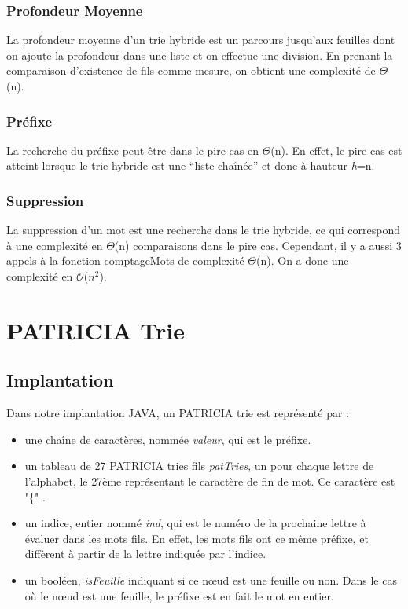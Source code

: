 \documentclass[a4paper,12pt]{report}
\begin{document}
\subsection{Profondeur Moyenne}
La profondeur moyenne d'un trie hybride est un parcours jusqu'aux feuilles dont on ajoute la profondeur dans une liste et on effectue
une division. En prenant la comparaison d'existence de fils comme mesure, on obtient une complexité de $\Theta$(n).

\subsection{Préfixe}
La recherche du préfixe peut être dans le pire cas en $\Theta$(n). En effet, le pire cas est atteint lorsque le trie hybride
est une ``liste chaînée'' et donc à hauteur \textit{h}=n.

\subsection{Suppression}
La suppression d'un mot est une recherche dans le trie hybride, ce qui correspond à une complexité en $\Theta$(n) comparaisons
dans le pire cas. Cependant, il y a aussi 3 appels à la fonction comptageMots de complexité $\Theta$(n).
On a donc une complexité en $\mathcal{O}$($n^2$).

\chapter{PATRICIA Trie}
\section{Implantation}
Dans notre implantation JAVA, un PATRICIA trie est représenté par :
\begin{itemize}
\item une chaîne de caractères, nommée {\itshape valeur}, qui est le préfixe.
\item un tableau de 27 PATRICIA tries fils {\itshape patTries}, un pour chaque lettre de l'alphabet, le 27ème représentant le caractère de fin de mot. Ce caractère est "\{" .
\item un indice, entier nommé {\itshape ind}, qui est le numéro de la prochaine lettre à évaluer dans les mots fils. En effet, les mots fils ont ce même préfixe, et diffèrent à partir de la lettre indiquée par l'indice.
\item un booléen, {\itshape isFeuille} indiquant si ce nœud est une feuille ou non. Dans le cas où le nœud est une feuille, le préfixe est en fait le mot en entier.
\end{itemize}
 \bigbreak
\end{document}
